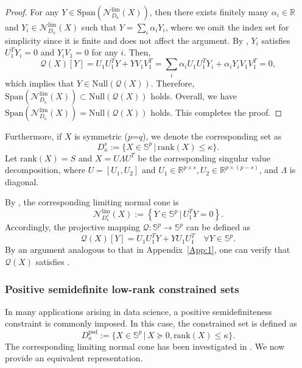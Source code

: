 \documentclass[11pt,a4paper,reqno]{amsart}
\begin{document}
{\begin{proof}
For any $Y\in \text{Span}\left( \mathcal N^{\text{lim}}_{D_{\kappa}}(X)\right)$, then there exists finitely many $\alpha_i \in \mathbb R$ and $Y_i 
\in \mathcal N^{\text{lim}}_{D_{\kappa}}(X)$ such that
$Y=\sum_{i}\alpha_i Y_i$, where we omit the index set for simplicity since it is finite and does not affect the argument. By , $Y_i$ satisfies $U_1^TY_i=0$ and $Y_i V_1=0$ for any $i$. Then,
\begin{equation*}
    \mathcal Q(X)[Y]=U_1U_1^TY+YV_1V_1^T=\sum_i \alpha_i U_1U_1^TY_i+\alpha_i Y_iV_1V_1^T=0,
\end{equation*}
which implies that $Y\in \text{Null} \left( \mathcal Q(X)\right )$. Therefore, $\text{Span}\left( \mathcal N^{\text{lim}}_{D_{\kappa}}(X)\right) \subset \text{Null} \left( \mathcal Q(X)\right )$ holds. Overall, we have $\text{Span}\left( \mathcal N^{\text{lim}}_{D_{\kappa}}(X)\right) = \text{Null} \left( \mathcal Q(X)\right )$ holds. This completes the proof.
\end{proof}

Furthermore, if $X$ is symmetric ($p$=$q$), we denote the corresponding set as 
\begin{equation*}
    D^{s}_{\kappa}:=\{X\in \mathbb S^{p} \,\big|\, \text{rank} (X) \leq \kappa \}.
\end{equation*}
Let $\text{rank} (X)=S$ and $X=U\Lambda U^T$ be the corresponding singular value decomposition, where $U=[U_1, U_2]$ and $U_1\in \mathbb R^{p\times s}, U_2\in \mathbb R^{p \times (p-s)}$, and $\Lambda$ is diagonal.

By \cite[Proposition~3.4]{tam2017regularity}, the corresponding limiting normal cone is
\begin{equation*}
    \mathcal N_{D^s_{\kappa}}^{\text{lim}}(X):=\left\{ Y\in \mathbb S^{p} \,\big|\, U_1^TY=0\right\}.
\end{equation*}
Accordingly, the projective mapping $\mathcal Q: \mathbb S^p \to \mathbb S^p$ can be defined as
\begin{equation*}
    \mathcal Q(X)[Y]=U_1U_1^TY+YU_1U_1^T \quad \forall Y\in \mathbb S^p.
\end{equation*}
By an argument analogous to that in Appendix~\ref{App:1}, one can verify that $\mathcal Q(X)$ satisfies .

\subsubsection{Positive semidefinite low-rank constrained sets}
In many applications arising in data science, a positive semidefiniteness constraint is commonly imposed. In this case, the constrained set is defined as
\begin{equation}\label{Eq:spdlr}
    D^{\text{psd}}_{\kappa}:=\{X\in \mathbb S^p \,|\, X \succeq 0, \text{rank} (X) \leq \kappa \}.
\end{equation}
The corresponding limiting normal cone has been investigated in \cite[Theorem~3.12]{tam2017regularity}. We now provide an equivalent representation.

}
\end{document}
